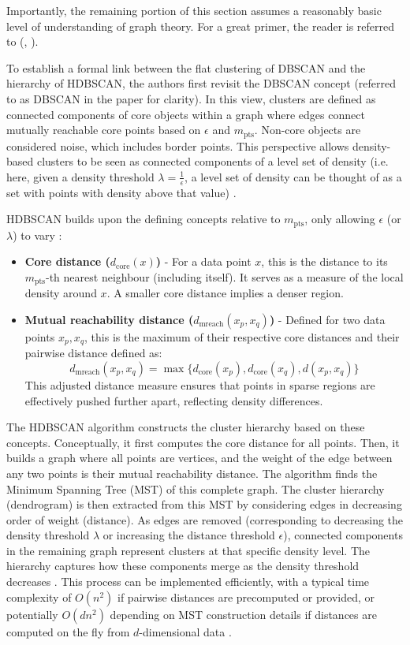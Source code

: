 \documentclass[10pt,oneside]{report}
\renewcommand{\citet}[1]{\citeauthor{#1}, \citeyear{#1}}
\begin{document}
Importantly, the remaining portion of this section assumes a reasonably basic level of understanding of graph theory. For a great primer, the reader is referred to (\citet{harris2008combinatorics}).

To establish a formal link between the flat clustering of DBSCAN and the hierarchy of HDBSCAN, the authors first revisit the DBSCAN concept (referred to as DBSCAN\* in the paper for clarity). In this view, clusters are defined as connected components of core objects within a graph where edges connect mutually reachable core points based on $\epsilon$ and $m_{\text{pts}}$. Non-core objects are considered noise, which includes border points. This perspective allows density-based clusters to be seen as connected components of a level set of density (i.e. here, given a density threshold $\lambda = \frac 1 \epsilon$, a level set of density can be thought of as a set with points with density above that value) \cite{campello2013density}.

HDBSCAN builds upon the defining concepts relative to $m_{\text{pts}}$, only allowing $\epsilon$ (or $\lambda$) to vary \cite{campello2013density}:
\begin{itemize}
    \item \textbf{Core distance ($d_{\text{core}}(x)$)} - For a data point $x$, this is the distance to its $m_{\text{pts}}$-th nearest neighbour (including itself). It serves as a measure of the local density around $x$. A smaller core distance implies a denser region.
    \item \textbf{Mutual reachability distance ($d_{\text{mreach}}(x_p, x_q)$)} - Defined for two data points $x_p, x_q$, this is the maximum of their respective core distances and their pairwise distance defined as:
        \[d_{\text{mreach}}(x_p, x_q) = \max \{ d_{\text{core}}(x_p), d_{\text{core}}(x_q), d(x_p, x_q) \}\]
    This adjusted distance measure ensures that points in sparse regions are effectively pushed further apart, reflecting density differences.
\end{itemize}

The HDBSCAN algorithm constructs the cluster hierarchy based on these concepts. Conceptually, it first computes the core distance for all points. Then, it builds a graph where all points are vertices, and the weight of the edge between any two points is their mutual reachability distance. The algorithm finds the Minimum Spanning Tree (MST) of this complete graph. The cluster hierarchy (dendrogram) is then extracted from this MST by considering edges in decreasing order of weight (distance). As edges are removed (corresponding to decreasing the density threshold $\lambda$ or increasing the distance threshold $\epsilon$), connected components in the remaining graph represent clusters at that specific density level. The hierarchy captures how these components merge as the density threshold decreases \cite{campello2013density}. This process can be implemented efficiently, with a typical time complexity of $O(n^2)$ if pairwise distances are precomputed or provided, or potentially $O(dn^2)$ depending on MST construction details if distances are computed on the fly from $d$-dimensional data \cite{campello2013density}.
\end{document}
